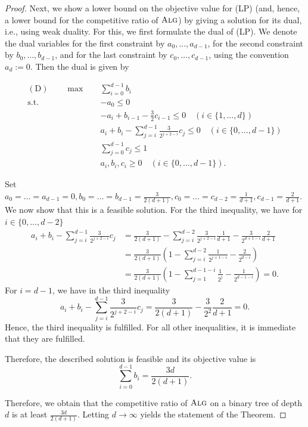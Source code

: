 \documentclass[a4paper,USenglish,cleveref,autoref,thm-restate,pdfa]{lipics-v2021}
\let\leq\leqslant
\let\geq\geqslant
\newcommand{\alg}{\textsc{Alg}\xspace}
\begin{document}
\begin{proof}
Next, we show a lower bound on the objective value for (LP) (and, hence, a lower bound for the competitive ratio of $\alg$) by giving a solution for its dual, i.e., using weak duality. For this, we first formulate the dual of (LP). We denote the dual variables for the first constraint by $a_0, \dots, a_{d-1}$, for the second constraint by $b_0, \dots, b_{d-1}$, and for the last constraint by $c_0, \dots, c_{d-1}$, using the convention $a_d := 0$. Then the dual is given by

\begin{align*}
\mathrm{(D)}\qquad  \max \quad& \sum\limits_{i=0}^{d-1} b_i\\
\text{s.t.}  \quad& -a_0\leq 0\\
& - a_{i}+b_{i-1} - \frac{3}{2}c_{i-1} \leq 0 \quad (i\in \{1, \dots, d\})\\
& a_i + b_i  - \sum\limits_{j=i}^{d-1} \frac{3}{2^{j+2-i}} c_j \leq 0 \quad (i\in \{0, \dots, d-1\})\\
& \sum\limits_{j=0}^{d-1} c_j \leq 1\\
& a_i, b_i, c_i \geq 0 \quad (i\in \{0, \dots, d-1\}).
\end{align*}

Set $a_0= \dots = a_{d-1}=0, b_0=\dots=b_{d-1}=\frac{3}{2(d+1)}, c_0=\dots=c_{d-2}=\frac{1}{d+1}, c_{d-1}=\frac{2}{d+1}$.
We now show that this is a feasible solution. For the third inequality, we have for $i \in \{0, \dots, d-2\}$
\begin{align*}
a_i + b_i  - \sum\limits_{j=i}^{d-1} \frac{3}{2^{j+2-i}} c_j
&= \frac{3}{2(d+1)} -\sum\limits_{j=i}^{d-2} \frac{3}{2^{j+2-i}} \frac{1}{d+1} -\frac{3}{2^{d+1-i}}\frac{2}{d+1}\\
&= \frac{3}{2(d+1)} \left( 1- \sum\limits_{j=i}^{d-2} \frac{1}{2^{j+1-i}} - \frac{2}{2^{d-i}} \right)\\
&= \frac{3}{2(d+1)} \left( 1- \sum\limits_{j=1}^{d-1-i} \frac{1}{2^{j}} - \frac{1}{2^{d-1-i}} \right) =0.
\end{align*}
For $i=d-1$, we have in the third inequality
\begin{equation*}
a_i + b_i  - \sum\limits_{j=i}^{d-1} \frac{3}{2^{j+2-i}} c_j= \frac{3}{2(d+1)} - \frac{3}{2^2} \frac{2}{d+1}=0.
\end{equation*}
Hence, the third inequality is fulfilled. For all other inequalities, it is immediate that they are fulfilled.

Therefore, the described solution is feasible and its objective value is
\begin{equation*}
\sum\limits_{i=0}^{d-1} b_i = \frac{3d}{2(d+1)}.
\end{equation*}

Therefore, we obtain that the competitive ratio of $\alg$ on a binary tree of depth $d$ is at least $\frac{3d}{2(d+1)}$. Letting $d\to\infty$ yields the statement of the Theorem.
\end{proof}
\end{document}

